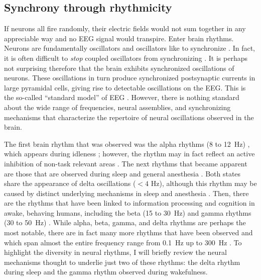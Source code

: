 \subsection{Synchrony through rhythmicity}
If neurons all fire randomly, their electric fields would not sum together in any appreciable way and no EEG signal would transpire. Enter brain rhythms. Neurons are fundamentally oscillators \cite{HODGKIN1952} and oscillators like to synchronize \cite{Strogatz2015}. In fact, it is often difficult to \textit{stop} coupled oscillators from synchronizing \cite{Erb1992}. It is perhaps not surprising therefore that the brain exhibits synchronized oscillations of neurons. These oscillations in turn produce synchronized postsynaptic currents in large pyramidal cells, giving rise to detectable oscillations on the EEG. This is the so-called ``standard model'' of EEG \cite{Cohen2017}. However, there is nothing standard about the wide range of frequencies, neural assemblies, and synchronizing mechanisms that characterize the repertoire of neural oscillations observed in the brain.

The first brain rhythm that was observed was the alpha rhythms (8 to \qty{12}{\hertz}) \cite{Berger1929}, which appears during idleness \cite{Adrian1934}; however, the rhythm may in fact reflect an active inhibition of non-task relevant areas \cite{Cooper2003}. The next rhythms that became apparent are those that are observed during sleep \cite{Loomis1937,Weber2016} and general anesthesia \cite{GIBBS1937,Akeju2017}. Both states share the appearance of delta oscillations ($<4$ \unit{\hertz}), although this rhythm may be caused by distinct underlying mechanisms in sleep and anesthesia \cite{Akeju2017}. Then, there are the rhythms that have been linked to information processing and cognition in awake, behaving humans, including the beta (15 to \qty{30}{\hertz}) \cite{Spitzer2017} and gamma rhythms (30 to \qty{50}{\hertz}) \cite{JASPER1938,Fries2009}. While alpha, beta, gamma, and delta rhythms are perhaps the most notable, there are in fact many more rhythms that have been observed and which span almost the entire frequency range from \qty{0.1}{\hertz} up to \qty{300}{\hertz} \cite{Penttonen2003}. To highlight the diversity in neural rhythms, I will briefly review the neural mechanisms thought to underlie just two of these rhythms: the delta rhythm during sleep and the gamma rhythm observed during wakefulness.

